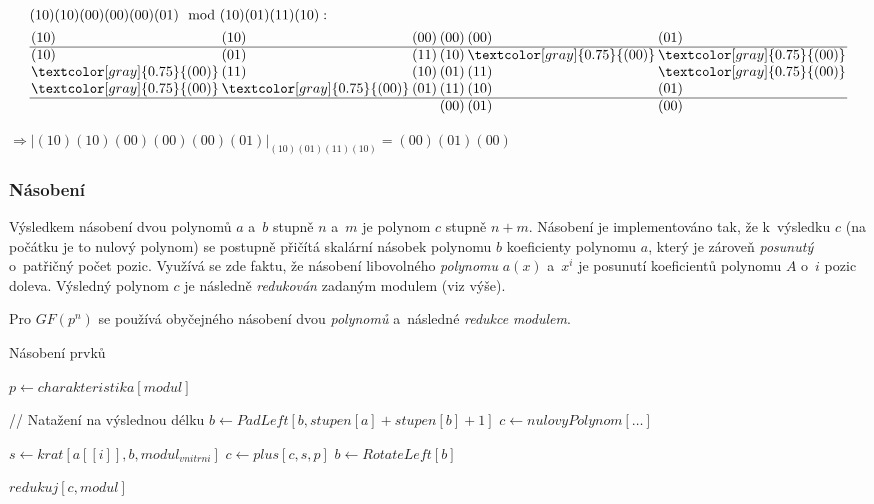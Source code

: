 \documentclass[thesis=M,czech,hidelinks]{FITthesis}[2012/06/26]
\newcommand{\0}{{\textcolor[gray]{0.75}{0}}}
\newenvironment{algoritmus}{
    \floatname{algorithm}{Algoritmus}
    \begin{algorithm}
}{\end{algorithm}}
\begin{document}
\renewcommand{\0}{{\textcolor[gray]{0.75}{(00)}}}
\begin{align*}
&(10)(10)(00)(00)(00)(01) \mod (10)(01)(11)(10) : \\
& \arraycolsep=1pt
\begin{array}{*{6}{l}}
        (10) & (10) & (00) & (00) & (00) & (01) \\
    \hline
        (10) & (01) & (11) & (10) &  \0  &  \0  \\
         \0  & (11) & (10) & (01) & (11) &  \0  \\
         \0  &  \0  & (01) & (11) & (10) & (01) \\
    \hline
             &      &      & (00) & (01) & (00) \\
\end{array}
\end{align*}

$
    \Rightarrow
    \left| (10)(10)(00)(00)(00)(01) \right|_{(10)(01)(11)(10)} = (00)(01)(00)
$


\subsubsection{Násobení}

Výsledkem násobení dvou polynomů $a$ a~$b$ stupně $n$ a~$m$ je polynom $c$
stupně $n+m$. Násobení je implementováno tak, že k~výsledku $c$ (na počátku je
to nulový polynom) se postupně přičítá skalární násobek polynomu $b$ koeficienty
polynomu $a$, který je zároveň \emph{posunutý} o~patřičný počet pozic. Využívá
se zde faktu, že násobení libovolného \emph{polynomu} $a(x)$ a~$x^i$ je posunutí
koeficientů polynomu $A$ o~$i$ pozic doleva. Výsledný polynom $c$ je následně
\emph{redukován} zadaným modulem (viz výše).

Pro $GF(p^n)$ se používá obyčejného násobení dvou \emph{polynomů} a~následné
\emph{redukce} \emph{modulem}.

\begin{algoritmus}[!ht]
    \caption{Násobení prvků}
    \begin{algorithmic}[1]
        \State $ p \gets charakteristika[ modul ] $

        // Natažení na výslednou délku
        \State $ b \gets PadLeft[ b, stupen[a] + stupen[b] + 1 ] $
        \State $ c \gets nulovyPolynom[\ldots ] $

        \hfil
            \State $ s \gets krat[ a[[i]], b, modul_{vnitrni} ] $
            \State $ c \gets plus[ c, s, p ] $
            \State $ b \gets RotateLeft[b] $
        \EndFor

        \hfil
        \State \Return $redukuj[c,modul]$
     \EndFunction
    \end{algorithmic}
\end{algoritmus}
\end{document}
